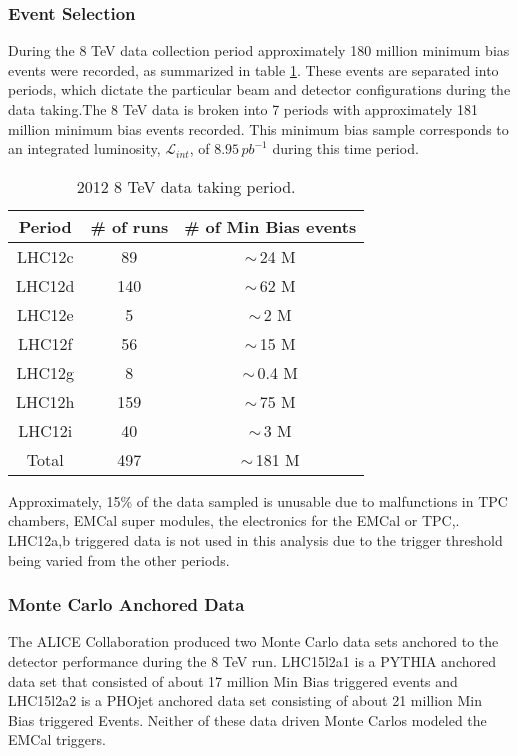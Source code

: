 \subsubsection{Event Selection}




During the 8 TeV data collection period approximately 180 million minimum bias events were recorded, as summarized in table \ref{tab:RunSummary}.  These events are separated into periods, which dictate the particular beam and detector configurations during the data taking.The 8 TeV data is broken into 7 periods with approximately 181 million minimum bias events recorded.  This minimum bias sample corresponds to an integrated luminosity, $\mathscr{L}_{int}$, of $8.95 \, pb^{-1}$ during this time period\cite{ALICE-PUBLIC-2017-002}.

\begin{table}[hb]
\label{tab:RunSummary}
\begin{center}
\begin{tabular}[b]{|c|c|c|}
	\hline
	Period & \# of runs & \# of Min Bias events \\ \hline
	LHC12c & 89 & $\sim \,$24 M \\ \hline
	LHC12d & 140 & $\sim \,$62 M \\ \hline
	LHC12e & 5 & $\sim \,$2 M \\ \hline
	LHC12f & 56 & $\sim \,$15 M \\ \hline
	LHC12g & 8 & $\sim \,$0.4 M \\ \hline
	LHC12h & 159 & $\sim \,$75 M \\ \hline
	LHC12i & 40 & $\sim \,$3 M \\ \hline
	Total & 497 & $\sim \,$181 M \\ \hline

\end{tabular}
\end{center}
\caption{2012 8 TeV data taking period.}
\end{table}

Approximately, 15\% of the data sampled is unusable due to malfunctions in TPC chambers, EMCal super modules, the electronics for the EMCal or TPC,.  LHC12a,b triggered data is not used in this analysis due to the trigger threshold being varied from the other periods.  

\subsubsection{Monte Carlo Anchored Data}
The ALICE Collaboration produced two Monte Carlo data sets anchored to the detector performance during the 8 TeV run.  LHC15l2a1 is a PYTHIA anchored data set that consisted of about 17 million Min Bias triggered events and LHC15l2a2 is a PHOjet anchored data set consisting of about 21 million Min Bias triggered Events.  Neither of these data driven Monte Carlos modeled the EMCal triggers.

